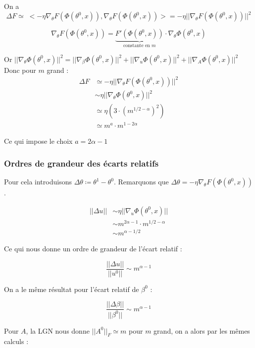 \documentclass[a4paper, 11pt, french]{article}
\begin{document}
	 On a 
	 \[
	 \Delta F \simeq \; < -\eta \nabla_{\theta} F(\Phi(\theta^0, x)) , \nabla_{\theta} F(\Phi(\theta^0, x)) > = -\eta || \nabla_{\theta} F(\Phi(\theta^0, x)) ||^2
	 \]
	 
	 \[
	 \nabla_{\theta} F(\Phi(\theta^0, x)) = 
	 \underbrace{F'(\Phi(\theta^0, x))}_\text{constante en $m$} 
	 \cdot \nabla_{\theta} \Phi(\theta^0, x)
	 \]
	 
	 Or $ || \nabla_{\theta} \Phi(\theta^0, x) ||^2 = || \nabla_{\beta} \Phi(\theta^0, x) ||^2 + || \nabla_{u} \Phi(\theta^0, x) ||^2 + || \nabla_{A} \Phi(\theta^0, x) ||^2$ \\
	 
	 Donc pour $m$ grand :
	 \begin{align*}
	 	\Delta F &\simeq -\eta || \nabla_{\theta} F(\Phi(\theta^0, x)) ||^2 \\
	 	&\sim \eta || \nabla_{\theta} \Phi(\theta^0, x) ||^2 \\
	 	&\simeq \eta (3 \cdot (m^{1/2 - \alpha})^2) \\
	 	&\simeq m^a \cdot m^{1 - 2\alpha}
	 \end{align*}	
	
	Ce qui impose le choix $a = 2\alpha - 1$ \\
	
	\subsubsection{Ordres de grandeur des écarts relatifs}

	Pour cela introduisons $\Delta \theta \coloneqq \theta^1 - \theta^0$. Remarquons que $	\Delta \theta = - \eta \nabla_{\theta} F(\Phi(\theta^0, x))$.
	
	\begin{align}
		||\Delta u|| &\sim \eta || \nabla_u \Phi(\theta^0, x) || \\
		&\sim m^{2\alpha - 1} \cdot m^{1/2 - \alpha} \\
		&\sim m^{\alpha - 1/2}
	\end{align}

	Ce qui nous donne un ordre de grandeur de l'écart relatif :
	
	\[\frac{||\Delta u||}{||u^0||} \sim m^{\alpha - 1}\]
	
	On a le même résultat pour l'écart relatif de $\beta^0$ :
	
	\[\frac{||\Delta \beta||}{||\beta^0||} \sim m^{\alpha - 1}\]
	
	Pour $A$, la LGN nous donne $||A^0||_F \simeq m$ pour $m$ grand, on a alors par les mêmes calculs :
	
\end{document}
